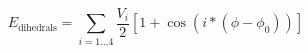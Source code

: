 \begin{equation}
E_\mathrm{dihedrals} = \sum_{i=1\dots4} {\frac {V_i} {2} \left [ 1 + \cos \left ( i * (\phi-\phi_0) \right ) \right ] }
\end{equation}
